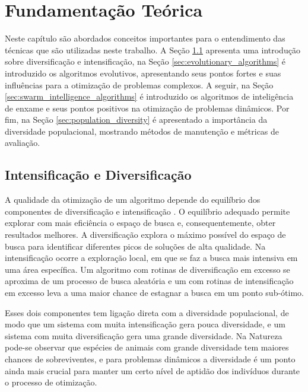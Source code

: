 \chapter{Fundamentação Teórica}
\label{ch:fundamentos}

Neste capítulo são abordados conceitos importantes para o entendimento das técnicas que são utilizadas neste trabalho. A Seção \ref{sec:intesification_diversification} apresenta uma introdução sobre diversificação e intensificação, na Seção \ref{sec:evolutionary_algorithms} é introduzido os algoritmos evolutivos, apresentando seus pontos fortes e suas influências para a otimização de problemas complexos. A seguir, na Seção \ref{sec:swarm_intelligence_algorithms} é introduzido os algoritmos de inteligência de enxame e seus pontos positivos na otimização de problemas dinâmicos. Por fim, na Seção \ref{sec:population_diversity} é apresentado a importância da diversidade populacional, mostrando métodos de manutenção e métricas de avaliação.

\section{Intensificação e Diversificação}
\label{sec:intesification_diversification}

A qualidade da otimização de um algoritmo depende do equilíbrio dos componentes de diversificação e intensificação \cite{vcrepinvsek2013exploration}. O equilíbrio adequado permite explorar com mais eficiência o espaço de busca e, consequentemente, obter resultados melhores. A diversificação explora o máximo possível do espaço de busca para identificar diferentes picos de soluções de alta qualidade. Na intensificação ocorre a exploração local, em que se faz a busca mais intensiva em uma área específica. Um algoritmo com rotinas de diversificação em excesso se aproxima de um processo de busca aleatória e um com rotinas de intensificação em excesso leva a uma maior chance de estagnar a busca em um ponto sub-ótimo. 

Esses dois componentes tem ligação direta com a diversidade populacional, de modo que um sistema com muita intensificação gera pouca diversidade, e um sistema com muita diversificação gera uma grande diversidade. Na Natureza pode-se observar que espécies de animais com grande diversidade tem maiores chances de sobreviventes, e para problemas dinâmicos a diversidade é um ponto ainda mais crucial para manter um certo nível de aptidão dos indivíduos durante o processo de otimização.

